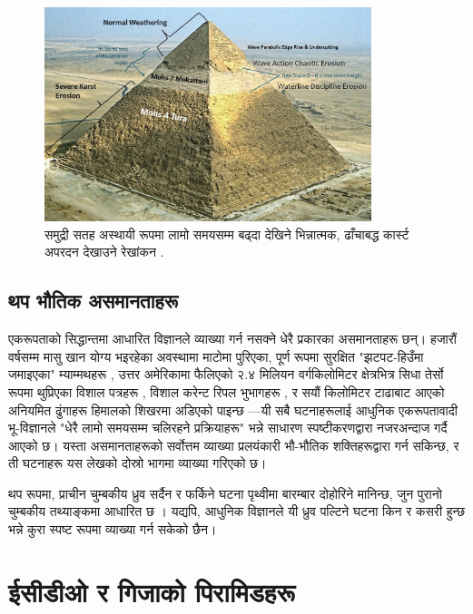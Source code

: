 \documentclass[10pt,twocolumn,letterpaper]{article}
\begin{document}
\begin{figure}[t]
\begin{center}
\includegraphics[width=0.85\textwidth]{khafre.jpg}
\end{center}
   \caption{समुद्री सतह अस्थायी रूपमा लामो समयसम्म बढ्दा देखिने भिन्नात्मक, ढाँचाबद्ध कार्स्ट अपरदन देखाउने रेखांकन \cite{27}.}
\label{fig:4}
\end{figure}
\subsection{थप भौतिक असमानताहरू}

एकरूपताको सिद्धान्तमा आधारित विज्ञानले व्याख्या गर्न नसक्ने धेरै प्रकारका असमानताहरू छन्। हजारौं वर्षसम्म मासु खान योग्य भइरहेका अवस्थामा माटोमा पुरिएका, पूर्ण रूपमा सुरक्षित "झटपट-हिउँमा जमाइएका" म्याम्मथहरू \cite{17,18,19}, उत्तर अमेरिकामा फैलिएको २.४ मिलियन वर्गकिलोमिटर क्षेत्रभित्र सिधा तेर्सो रूपमा थुप्रिएका विशाल पत्रहरू \cite{21}, विशाल करेन्ट रिपल भुभागहरू \cite{22}, र सयौं किलोमिटर टाढाबाट आएको अनियमित ढुंगाहरू हिमालको शिखरमा अडिएको पाइन्छ \cite{23,26}—यी सबै घटनाहरूलाई आधुनिक एकरूपतावादी भू-विज्ञानले "धेरै लामो समयसम्म चलिरहने प्रक्रियाहरू" भन्ने साधारण स्पष्टीकरणद्वारा नजरअन्दाज गर्दै आएको छ। यस्ता असमानताहरूको सर्वोत्तम व्याख्या प्रलयंकारी भौ-भौतिक शक्तिहरूद्वारा गर्न सकिन्छ, र ती घटनाहरू यस लेखको दोस्रो भागमा व्याख्या गरिएको छ।

थप रूपमा, प्राचीन चुम्बकीय ध्रुव सर्दैन र फर्किने घटना पृथ्वीमा बारम्बार दोहोरिने मानिन्छ, जुन पुरानो चुम्बकीय तथ्याङ्कमा आधारित छ \cite{35,40,41}। यद्यपि, आधुनिक विज्ञानले यी ध्रुव पल्टिने घटना किन र कसरी हुन्छ भन्ने कुरा स्पष्ट रूपमा व्याख्या गर्न सकेको छैन।

\section{ईसीडीओ र गिजाको पिरामिडहरू}
\end{document}
